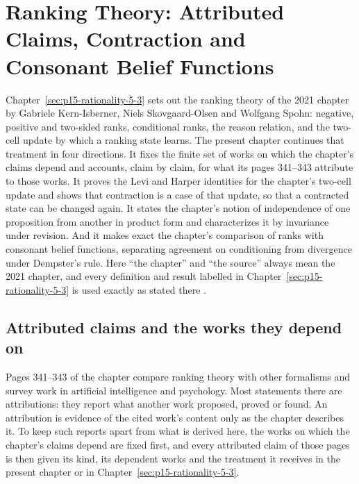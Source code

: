 \chapter{Ranking Theory: Attributed Claims, Contraction and Consonant Belief Functions}
\label{sec:p15-w02b-p15-039}

Chapter~\ref{sec:p15-rationality-5-3} sets out the ranking theory of the 2021
chapter by Gabriele Kern-Isberner, Niels Skovgaard-Olsen and Wolfgang Spohn:
negative, positive and two-sided ranks, conditional ranks, the reason
relation, and the two-cell update by which a ranking state learns.  The
present chapter continues that treatment in four directions.  It fixes the
finite set of works on which the chapter's claims depend and accounts, claim
by claim, for what its pages 341--343 attribute to those works.  It proves the
Levi and Harper identities for the chapter's two-cell update and shows that
contraction is a case of that update, so that a contracted state can be
changed again.  It states the chapter's notion of independence of one
proposition from another in product form and characterizes it by invariance
under revision.  And it makes exact the chapter's comparison of ranks with
consonant belief functions, separating agreement on conditioning from
divergence under Dempster's rule.  Here ``the chapter'' and ``the source''
always mean the 2021 chapter, and every definition and result labelled in
Chapter~\ref{sec:p15-rationality-5-3} is used exactly as stated there
\parencite[pp.~337--345]{KernIsbernerSkovgaardOlsenSpohn2021Ranking}.

\section{Attributed claims and the works they depend on}
\label{sec:p15-w02b-p15-039-dependents}

Pages 341--343 of the chapter compare ranking theory with other formalisms
and survey work in artificial intelligence and psychology.  Most statements
there are attributions: they report what another work proposed, proved or
found.  An attribution is evidence of the cited work's content only as the
chapter describes it.  To keep such reports apart from what is derived here,
the works on which the chapter's claims depend are fixed first, and every
attributed claim of those pages is then given its kind, its dependent works
and the treatment it receives in the present chapter or in
Chapter~\ref{sec:p15-rationality-5-3}.

